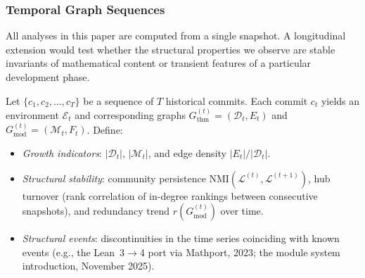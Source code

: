 \subsubsection{Temporal Graph Sequences}
\label{sec:temporal-graphs}

All analyses in this paper are computed from a single snapshot. A longitudinal extension would test whether the structural properties we observe are stable invariants of mathematical content or transient features of a particular development phase.

\begin{definition}\label{def:temporal-sequence}
Let $\{c_1, c_2, \ldots, c_T\}$ be a sequence of $T$ historical  commits. Each commit $c_t$ yields an environment $\mathcal{E}_t$ and corresponding graphs $G_{\mathrm{thm}}^{(t)} = (\mathcal{D}_t, E_t)$ and $G_{\mathrm{mod}}^{(t)} = (\mathcal{M}_t, F_t)$. Define:
\begin{itemize}
  \item \emph{Growth indicators}: $|\mathcal{D}_t|$, $|\mathcal{M}_t|$, and edge density $|E_t| / |\mathcal{D}_t|$.
  \item \emph{Structural stability}: community persistence $\mathrm{NMI}(\mathcal{L}^{(t)}, \mathcal{L}^{(t+1)})$, hub turnover (rank correlation of in-degree rankings between consecutive snapshots), and redundancy trend $r(G_{\mathrm{mod}}^{(t)})$ over time.
  \item \emph{Structural events}: discontinuities in the time series coinciding with known events (e.g., the Lean~3$\to$4 port via Mathport, 2023; the module system introduction, November 2025).
\end{itemize}
\end{definition}

